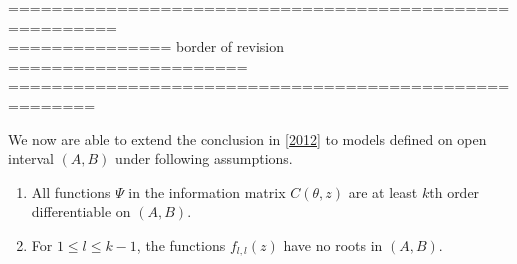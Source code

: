 \documentclass[11pt]{amsart}
\theoremstyle{definition}
\theoremstyle{remark}
\begin{document}
 
  
 ========================================================\\
 ===============  border of revision ======================\\
 ======================================================
 
 

 

We now are able to extend the conclusion in \ref{2012} to models defined on open interval $(A,B)$ under following assumptions. \begin{enumerate}
\item All functions $\Psi$ in the information matrix $C(\theta,z)$ are at least $k$th order differentiable on $(A,B)$.
\item For $1\le l\le k-1$, the functions $f_{l,l}(z)$ have no roots in $(A,B)$.
\end{enumerate} 
\end{document}
